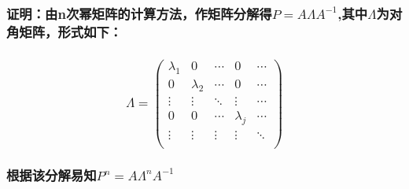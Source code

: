 \documentclass[11pt]{article}
\begin{document}
\subsubsection{\texorpdfstring{证明：由n次幂矩阵的计算方法，作矩阵分解得\(P=A\Lambda A^{-1}\),其中\(\Lambda\)为对角矩阵，形式如下：}{证明：由n次幂矩阵的计算方法，作矩阵分解得P=A\textbackslash{}Lambda A\^{}\{-1\},其中\textbackslash{}Lambda为对角矩阵，形式如下：}}\label{ux8bc1ux660eux7531nux6b21ux5e42ux77e9ux9635ux7684ux8ba1ux7b97ux65b9ux6cd5ux4f5cux77e9ux9635ux5206ux89e3ux5f97palambda-a-1ux5176ux4e2dlambdaux4e3aux5bf9ux89d2ux77e9ux9635ux5f62ux5f0fux5982ux4e0b}

\subsubsection{\texorpdfstring{\[ \Lambda=
        \left (\begin{matrix}
        \lambda_1 & 0 & \cdots& 0& \cdots  \\
        0  & \lambda_2 & \cdots & 0 & \cdots \\
        \vdots & \vdots & \ddots & \vdots & \cdots \\
       0 & 0 & \cdots & \lambda_j & \cdots \\
        \vdots & \vdots & \vdots & \vdots & \ddots \\
        \end{matrix} \right)\]}{ \textbackslash{}Lambda=
        \textbackslash{}left (\textbackslash{}begin\{matrix\}
        \textbackslash{}lambda\_1 \& 0 \& \textbackslash{}cdots\& 0\& \textbackslash{}cdots  \textbackslash{}\textbackslash{}
        0  \& \textbackslash{}lambda\_2 \& \textbackslash{}cdots \& 0 \& \textbackslash{}cdots \textbackslash{}\textbackslash{}
        \textbackslash{}vdots \& \textbackslash{}vdots \& \textbackslash{}ddots \& \textbackslash{}vdots \& \textbackslash{}cdots \textbackslash{}\textbackslash{}
       0 \& 0 \& \textbackslash{}cdots \& \textbackslash{}lambda\_j \& \textbackslash{}cdots \textbackslash{}\textbackslash{}
        \textbackslash{}vdots \& \textbackslash{}vdots \& \textbackslash{}vdots \& \textbackslash{}vdots \& \textbackslash{}ddots \textbackslash{}\textbackslash{}
        \textbackslash{}end\{matrix\} \textbackslash{}right)}}\label{lambda-left-beginmatrix-lambda_1-0-cdots-0-cdots-0-lambda_2-cdots-0-cdots-vdots-vdots-ddots-vdots-cdots-0-0-cdots-lambda_j-cdots-vdots-vdots-vdots-vdots-ddots-endmatrix-right}

\subsubsection{\texorpdfstring{根据该分解易知\(P^n=A\Lambda^nA^{-1}\)}{根据该分解易知P\^{}n=A\textbackslash{}Lambda\^{}nA\^{}\{-1\}}}\label{ux6839ux636eux8be5ux5206ux89e3ux6613ux77e5pnalambdana-1}
\end{document}
